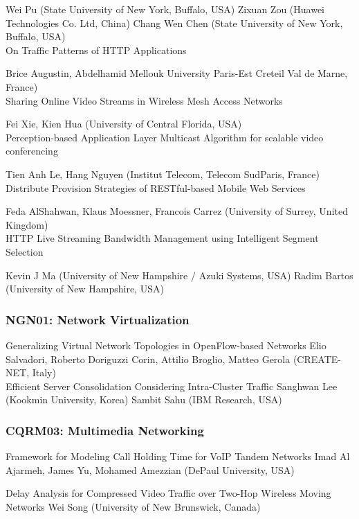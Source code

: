 \documentclass[•]{article}
\begin{document}
Wei Pu (State University of New York, Buffalo, USA)
Zixuan Zou (Huawei Technologies Co. Ltd, China)
Chang Wen Chen (State University of New York, Buffalo, USA)\\

On Traffic Patterns of HTTP Applications

Brice Augustin, Abdelhamid Mellouk University Paris-Est Creteil Val de Marne, France)\\

Sharing Online Video Streams in Wireless Mesh Access Networks

Fei Xie, Kien Hua (University of Central Florida, USA)\\

Perception-based Application Layer Multicast Algorithm for scalable video conferencing

Tien Anh Le, Hang Nguyen (Institut Telecom, Telecom SudParis, France)\\

Distribute Provision Strategies of RESTful-based Mobile Web Services

Feda AlShahwan, Klaus Moessner, Francois Carrez (University of Surrey, United Kingdom)\\

HTTP Live Streaming Bandwidth Management using Intelligent Segment Selection

Kevin J Ma (University of New Hampshire / Azuki Systems, USA)
Radim Bartos (University of New Hampshire, USA)


\subsubsection{NGN01: Network Virtualization}
Generalizing Virtual Network Topologies in OpenFlow-based Networks
Elio Salvadori, Roberto Doriguzzi Corin, Attilio Broglio, Matteo Gerola (CREATE-NET, Italy)\\


Efficient Server Consolidation Considering Intra-Cluster Traffic
Sanghwan Lee (Kookmin University, Korea)
Sambit Sahu (IBM Research, USA)

\subsubsection{CQRM03: Multimedia Networking}
Framework for Modeling Call Holding Time for VoIP Tandem Networks
Imad Al Ajarmeh, James Yu, Mohamed Amezzian (DePaul University, USA)

Delay Analysis for Compressed Video Traffic over Two-Hop Wireless Moving Networks
Wei Song (University of New Brunswick, Canada)
\end{document}
